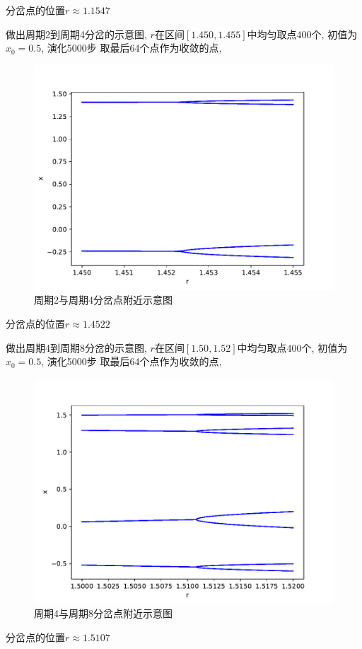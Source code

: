 \documentclass[a4paper,zihao=5,UTF8]{ctexart}
\begin{document}
    \par 
    分岔点的位置$r \approx 1.1547$
    \par 
    做出周期2到周期4分岔的示意图, $r$在区间$[1.450,1.455]$中均匀取点400个, 初值为$x_0 = 0.5$, 演化5000步
    取最后64个点作为收敛的点,
    \begin{figure}[htbp]
        \centering
        \includegraphics[scale=0.5]{9_3_2.pdf}
        \caption{周期2与周期4分岔点附近示意图}
    \end{figure}
    \par 
    分岔点的位置$r \approx 1.4522$

    \par 
    做出周期4到周期8分岔的示意图, $r$在区间$[1.50,1.52]$中均匀取点400个, 初值为$x_0 = 0.5$, 演化5000步
    取最后64个点作为收敛的点,
    \begin{figure}[htbp]
        \centering
        \includegraphics[scale=0.5]{9_3_3.pdf}
        \caption{周期4与周期8分岔点附近示意图}
    \end{figure}
    \par 
    分岔点的位置$r \approx 1.5107$
\end{document}
